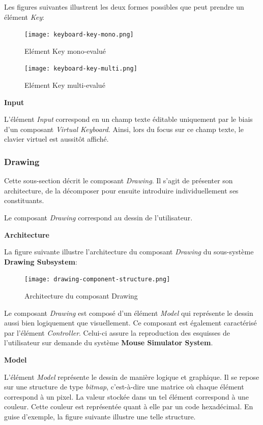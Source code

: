 \documentclass[11pt,a4paper,oldfontcommands]{memoir}
\begin{document}
Les figures suivantes illustrent les deux formes possibles que peut prendre un élément \textit{Key}:

\begin{figure}[H]
\centering
\texttt{[image: keyboard-key-mono.png]}
\caption{Elément Key mono-evalué}
\end{figure}

\begin{figure}[H]
\centering
\texttt{[image: keyboard-key-multi.png]}
\caption{Elément Key multi-evalué}
\end{figure}

\textbf{Input}

L'élément \textit{Input} correspond en un champ texte éditable uniquement par le biais d'un composant \textit{Virtual Keyboard}. Ainsi, lors du focus sur ce champ texte, le clavier virtuel est aussitôt affiché.

\subsubsection{Drawing}

Cette sous-section décrit le composant \textit{Drawing}. Il s'agit de présenter son architecture, de la décomposer pour ensuite introduire individuellement ses constituants.

Le composant \textit{Drawing} correspond au dessin de l'utilisateur.

\textbf{Architecture}

La figure suivante illustre l'architecture du composant \textit{Drawing} du sous-système \textbf{Drawing Subsystem}:

\begin{figure}[H]
\centering
\texttt{[image: drawing-component-structure.png]}
\caption{Architecture du composant Drawing}
\end{figure}

Le composant \textit{Drawing} est composé d'un élément \textit{Model} qui représente le dessin aussi bien logiquement que visuellement. Ce composant est également caractérisé par l'élément \textit{Controller}. Celui-ci assure la reproduction des esquisses de l'utilisateur sur demande du système \textbf{Mouse Simulator System}.

\textbf{Model}

L'élément \textit{Model} représente le dessin de manière logique et graphique. Il se repose sur une structure de type \textit{bitmap}, c’est-à-dire une matrice où chaque élément correspond à un pixel. La valeur stockée dans un tel élément correspond à une couleur. Cette couleur est représentée quant à elle par un code hexadécimal. En guise d’exemple, la figure suivante illustre une telle structure.
\end{document}
